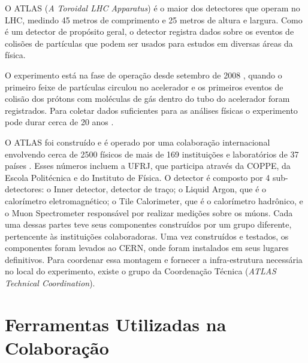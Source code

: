 O ATLAS (\textit{A Toroidal LHC Apparatus}) é o maior dos detectores que operam
no LHC, medindo 45 metros de comprimento e 25 metros de altura e largura. Como é
um detector de propósito geral, o detector registra dados sobre os eventos de
colisões de partículas que podem ser usados para estudos em diversas áreas da
física. 

O experimento está na fase de operação desde setembro de 2008 \cite{webLHCFirstBeam},
quando o primeiro feixe de partículas circulou no acelerador e os primeiros
eventos de colisão dos prótons com moléculas de gás dentro do tubo do acelerador
foram registrados. Para coletar dados suficientes para as análises físicas o
experimento pode durar cerca de 20 anos \cite{ATLAS_TDR}.

O ATLAS foi construído e é operado por uma colaboração internacional envolvendo
cerca de 2500 físicos de mais de 169 instituições e laboratórios de 37 países
\cite{webATLAS}. Esses números incluem a UFRJ, que participa através da COPPE,
da Escola Politécnica e do Instituto de Física. O detector é composto por 4
sub-detectores: o Inner detector, detector de traço; o Liquid Argon, que é o
calorímetro eletromagnético; o Tile Calorimeter, que é o calorímetro hadrônico,
e o Muon Spectrometer responsável por realizar medições sobre os múons. Cada uma
dessas partes teve seus componentes construídos por um grupo diferente,
pertencente às instituições colaboradoras.  Uma vez construídos e testados, os
componentes foram levados ao CERN, onde foram instalados em seus lugares
definitivos. Para coordenar essa montagem e fornecer a infra-estrutura
necessária no local do experimento, existe o grupo da Coordenação Técnica
({\it ATLAS Technical Coordination}).

\section{Ferramentas Utilizadas na Colaboração}
\label{sec:ferramentas}

